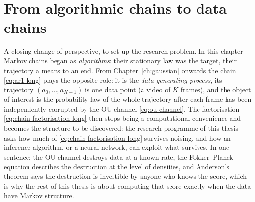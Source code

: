 \section{From algorithmic chains to data chains}

A closing change of perspective, to set up the research problem. In this
chapter Markov chains began as \emph{algorithms}: their stationary law
was the target, their trajectory a means to an end. From
Chapter~\ref{ch:gaussian} onwards the chain \eqref{eq:ar1-long} plays the
opposite role: it is the \emph{data-generating process}, its trajectory
$(a_0, \dots, a_{K-1})$ is one data point (a video of $K$ frames), and
the object of interest is the probability law of the whole trajectory
after each frame has been independently corrupted by the OU channel
\eqref{eq:ou-channel}. The factorisation \eqref{eq:chain-factorisation-long}
then stops being a computational convenience and becomes the structure to
be discovered: the research programme of this thesis asks how much of
\eqref{eq:chain-factorisation-long} survives noising, and how an inference
algorithm, or a neural network, can exploit what survives. In one
sentence: the OU channel destroys data at a known rate, the
Fokker--Planck equation describes the destruction at the level of
densities, and Anderson's theorem says the destruction is invertible by
anyone who knows the score, which is why the rest of this thesis is about
computing that score exactly when the data have Markov structure.
